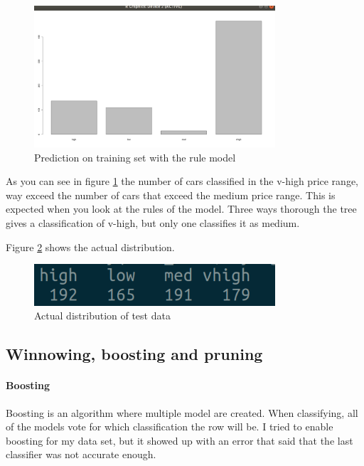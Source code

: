 \documentclass[a4paper, 12pt]{article}
\begin{document}
  \begin{figure}[h]
    \centering 
    \includegraphics[width=0.8\textwidth]
    {images/predict}
    \caption{Prediction on training set with the rule model}
    \label{fig:predict}
  \end{figure}

  As you can see in figure \ref{fig:predict} the number of cars classified in the v-high price range, way exceed the number of cars that exceed the medium price range. This is expected when you look at the rules of the model. Three ways thorough the tree gives a classification of v-high, but only one classifies it as medium.

  Figure \ref{fig:act} shows the actual distribution.

  \begin{figure}[h]
    \centering 
    \includegraphics[width=0.8\textwidth]
    {images/actual}
    \caption{Actual distribution of test data}
    \label{fig:act}
  \end{figure}

\subsection{Winnowing, boosting and pruning}
\paragraph{Boosting}
Boosting is an algorithm where multiple model are created. When classifying, all of the models vote for which classification the row will be. I tried to enable boosting for my data set, but it showed up with an error that said that the last classifier was not accurate enough.
\end{document}
